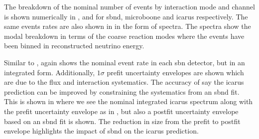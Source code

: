 The breakdown of the nominal number of events by interaction mode and channel is shown numerically in ,  and  for \gls{sbnd}, \gls{microboone} and \gls{icarus} respectively. The same events rates are also shown in  in the form of spectra. The spectra show the modal breakdown in terms of the coarse reaction modes where the events have been binned in reconstructed neutrino energy. 

Similar to ,  again shows the nominal event rate in each \gls{sbn} detector, but in an integrated form. Additionally, $1\sigma$ prefit uncertainty envelopes are shown which are due to the flux and interaction systematics. The accuracy of say the \gls{icarus} prediction can be improved by constraining the systematics from an \gls{sbnd} fit. This is shown in  where we see the nominal integrated \gls{icarus} spectrum along with the prefit uncertainty envelope as in , but also a postfit uncertainty envelope based on an \gls{sbnd} fit is shown. The reduction in size from the prefit to postfit envelope highlights the impact of \gls{sbnd} on the \gls{icarus} prediction. 

